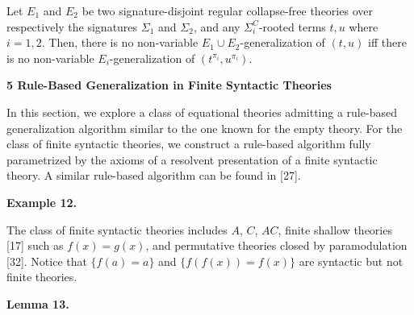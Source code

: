 \documentclass[10pt,a4paper]{amsart}
\begin{document}
 
Let $E_{1}$ and $E_{2}$ be two signature-disjoint regular collapse-free theories over respectively the signatures $\Sigma_{1}$ and $\Sigma_{2}$, and any ${\Sigma}^{C}_{i}$-rooted terms $t,u$ where $i=1,2$. Then, there is no non-variable $E_{1}\cup E_{2}$-generalization of $(t,u)$ iff there is no non-variable $E_{i}$-generalization of $(t^{\pi_{i}},u^{\pi_{i}})$.\par
 
 
 
 


 
\par\medskip\noindent\textbf{5 Rule-Based Generalization in Finite Syntactic Theories}\par
 
 
In this section, we explore a class of equational theories admitting a rule-based generalization algorithm similar to the one known for the empty theory. For the class of finite syntactic theories, we construct a rule-based algorithm fully parametrized by the axioms of a resolvent presentation of a finite syntactic theory. A similar rule-based algorithm can be found in [27].\par
 
 
 
\par\medskip\noindent\textbf{Example 12.}\par
 
 
The class of finite syntactic theories includes $A$, $C$, $AC$, finite shallow theories [17] such as $f(x)=g(x)$, and permutative theories closed by paramodulation [32]. Notice that $\{f(a)=a\}$ and $\{f(f(x))=f(x)\}$ are syntactic but not finite theories.\par
 
 
 
 
\par\medskip\noindent\textbf{Lemma 13.}\par
 
 
\end{document}

